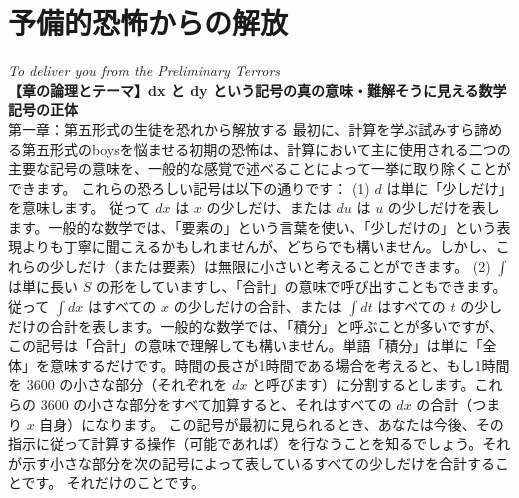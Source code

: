 \documentclass[a4paper,11pt,openany]{ltjsbook}
\begin{document}
\chapter{予備的恐怖からの解放}
\noindent\textit{\large To deliver you from the Preliminary Terrors}\\[2mm]
\noindent\textbf{\small 【章の論理とテーマ】dx と dy という記号の真の意味・難解そうに見える数学記号の正体}\\[4mm]
第一章：第五形式の生徒を恐れから解放する
最初に、計算を学ぶ試みすら諦める第五形式のboysを悩ませる初期の恐怖は、計算において主に使用される二つの主要な記号の意味を、一般的な感覚で述べることによって一挙に取り除くことができます。
これらの恐ろしい記号は以下の通りです：
(1) $d$ は単に「少しだけ」を意味します。
従って $dx$ は $x$ の少しだけ、または $du$ は $u$ の少しだけを表します。一般的な数学では、「要素の」という言葉を使い、「少しだけの」という表現よりも丁寧に聞こえるかもしれませんが、どちらでも構いません。しかし、これらの少しだけ（または要素）は無限に小さいと考えることができます。
(2) $\displaystyle \int$ は単に長い $S$ の形をしていますし、「合計」の意味で呼び出すこともできます。
従って $\displaystyle \int dx$ はすべての $x$ の少しだけの合計、または $\displaystyle \int dt$ はすべての $t$ の少しだけの合計を表します。一般的な数学では、「積分」と呼ぶことが多いですが、この記号は「合計」の意味で理解しても構いません。単語「積分」は単に「全体」を意味するだけです。時間の長さが1時間である場合を考えると、もし1時間を $3600$ の小さな部分（それぞれを $dx$ と呼びます）に分割するとします。これらの $3600$ の小さな部分をすべて加算すると、それはすべての $dx$ の合計（つまり $x$ 自身）になります。
この記号が最初に見られるとき、あなたは今後、その指示に従って計算する操作（可能であれば）を行なうことを知るでしょう。それが示す小さな部分を次の記号によって表しているすべての少しだけを合計することです。
それだけのことです。
\end{document}
